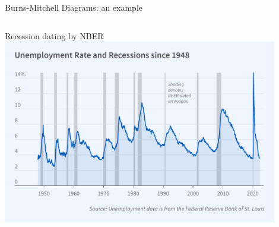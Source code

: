 \documentclass{beamer}
\begin{document}
\begin{frame}{Burns-Mitchell Diagrams: an example}
\begin{columns}
	
	
\end{columns} 
	       

\end{frame}

\begin{frame}{Recession dating by NBER}
  \centering
             \includegraphics[width=0.9\textwidth]{FIGURES/nber_unemp_aft1948}
\end{frame}
\end{document}
